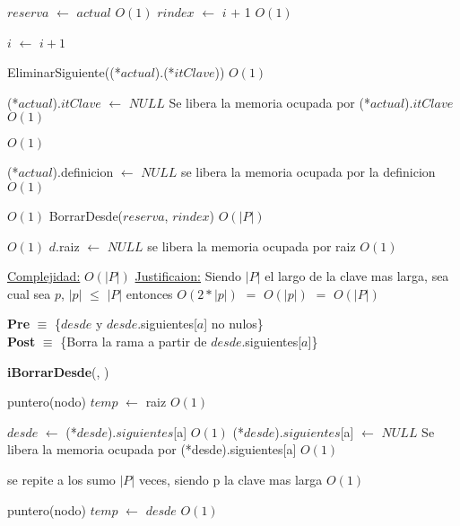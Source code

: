\begin{Algoritmos}
\begin{algorithm}[H]
\begin{algorithmic}[1]
	\State $reserva$ $\gets$ $actual$ \Comment $O(1)$
	\State $rindex$ $\gets$ $i$ $+$ 1 \Comment $O(1)$
	
	\EndIf

	\State $i$ $\gets$ $i + 1$
\EndWhile 


\State EliminarSiguiente((*$actual$).(*$itClave$)) \Comment $O(1)$

\State (*$actual$).$itClave$ $\gets$ $NULL$ \Comment Se libera la memoria ocupada por (*$actual$).$itClave$ $O(1)$

 \Comment $O(1)$

	\State (*$actual$).definicion $\gets$ $NULL$ \Comment se libera la memoria ocupada por la definicion $O(1)$

\EndIf 

 \Comment $O(1)$
	\State BorrarDesde($reserva$, $rindex$) \Comment $O(|P|)$
\EndIf 


 \Comment $O(1)$
	\State $d$.raiz $\gets$ $NULL$ \Comment se libera la memoria ocupada por raiz $O(1)$
\EndIf 


\medskip
\State \underline{Complejidad:} $O(|P|)$
\State \underline{Justificaion:} Siendo $|P|$ el largo de la clave mas larga, sea cual sea $p$, $|p|$ $\leq$ $|P|$ entonces $O(2*|p|)$ $=$	$O(|p|)$ $=$ $O(|P|)$

\end{algorithmic}
\end{algorithm}
  
\pagebreak
  
\textbf{Pre} $\equiv$ \{$desde$ y $desde$.siguientes[$a$] no nulos\}\\%
\textbf{Post} $\equiv$ \{Borra la rama a partir de $desde$.siguientes[$a$]\}%

 
\begin{algorithm}[H]
{\textbf{iBorrarDesde}(}, )
\begin{algorithmic}[1]

\State puntero(nodo) $temp$ $\gets$ raiz \Comment $O(1)$

\State $desde$ $\gets$ (*$desde$).$siguientes$[a] \Comment $O(1)$
\State (*$desde$).$siguientes$[a] $\gets$ $NULL$ \Comment Se libera la memoria ocupada por (*desde).siguientes[a] $O(1)$

 \Comment se repite a los sumo $|P|$ veces, siendo p la clave mas larga $O(1)$

	\State puntero(nodo) $temp$ $\gets$ $desde$ \Comment $O(1)$


\end{algorithmic}
\end{algorithm}
\end{Algoritmos}
